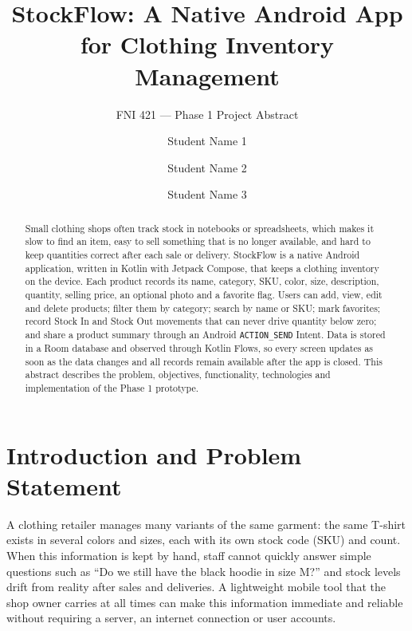 \documentclass[sigconf,nonacm]{acmart}
\begin{document}
\title{StockFlow: A Native Android App for Clothing Inventory Management}
\subtitle{FNI 421 — Phase 1 Project Abstract}

\author{Student Name 1}

\author{Student Name 2}

\author{Student Name 3}

\renewcommand{\shortauthors}{FNI 421 Project Team}

\begin{abstract}
Small clothing shops often track stock in notebooks or spreadsheets, which makes it
slow to find an item, easy to sell something that is no longer available, and hard
to keep quantities correct after each sale or delivery. StockFlow is a native
Android application, written in Kotlin with Jetpack Compose, that keeps a clothing
inventory on the device. Each product records its name, category, SKU, color, size,
description, quantity, selling price, an optional photo and a favorite flag. Users
can add, view, edit and delete products; filter them by category; search by name
or SKU; mark favorites; record Stock In and Stock Out movements that can never drive
quantity below zero; and share a product summary through an Android
\texttt{ACTION\_SEND} Intent. Data is stored in a Room database and observed through
Kotlin Flows, so every screen updates as soon as the data changes and all records
remain available after the app is closed. This abstract describes the problem,
objectives, functionality, technologies and implementation of the Phase 1 prototype.
\end{abstract}


\maketitle

\section{Introduction and Problem Statement}
A clothing retailer manages many variants of the same garment: the same T-shirt
exists in several colors and sizes, each with its own stock code (SKU) and count.
When this information is kept by hand, staff cannot quickly answer simple questions
such as ``Do we still have the black hoodie in size M?'' and stock levels drift from
reality after sales and deliveries. A lightweight mobile tool that the shop owner
carries at all times can make this information immediate and reliable without
requiring a server, an internet connection or user accounts.
\end{document}

